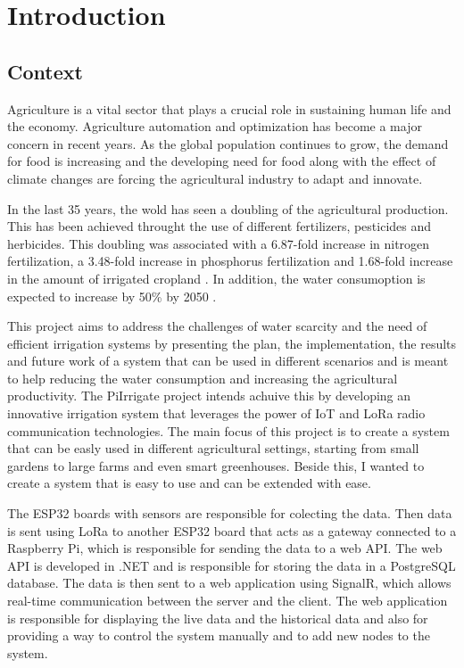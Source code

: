 \chapter{Introduction}\label{section:introduction}
\thispagestyle{pagestyle}


\section{Context}

Agriculture is a vital sector that plays a crucial role in sustaining human life and the economy.
Agriculture automation and optimization has become a major concern in recent years. 
As the global population continues to grow, the demand for food is increasing and the developing need for food
along with the effect of climate changes are forcing the agricultural industry to adapt and innovate\cite{OBAIDEEN2022100124}.

In the last 35 years, the wold has seen a doubling of the agricultural production. This has been achieved throught the use
of different fertilizers, pesticides and herbicides. This doubling was associated with a 6.87-fold increase in nitrogen fertilization,
a 3.48-fold increase in phosphorus fertilization and 1.68-fold increase in the amount of irrigated cropland \cite{doi:10.1073/pnas.96.11.5995}.
In addition, the water consumoption is expected to increase by 50\% by 2050 \cite{s20236865}. 

This project aims to address the challenges of water scarcity and the need of efficient irrigation systems
by presenting the plan, the implementation, the results and future work of a system that can be used in different
scenarios and is meant to help reducing the water consumption and increasing the agricultural productivity.
The PiIrrigate project intends achuive this by developing an innovative irrigation system that leverages the power of 
IoT and LoRa radio communication technologies.  
The main focus of this project is to create a system that can be easly used in different agricultural settings, 
starting from small gardens to large farms and even smart greenhouses. Beside this, I wanted to create a system that 
is easy to use and can be extended with ease. 

The ESP32 boards with sensors are responsible for colecting the data. Then data is sent using  LoRa to another
ESP32 board that acts as a gateway connected to a Raspberry Pi, which is responsible for sending the data to a web API.
The web API is developed in .NET and is responsible for storing the data in a PostgreSQL database.
The data is then sent to a web application using SignalR, which allows real-time communication between the server and the client.
The web application is responsible for displaying the live data and the historical data and also for providing a way to
control the system manually and to add new nodes to the system. 

